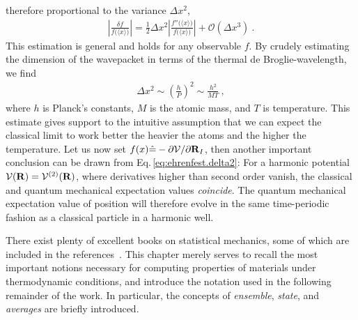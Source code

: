 therefore proportional to the variance $\Delta x^2$,
\begin{align}
\left\lvert \frac{\delta f}{f \bm ( \langle x \rangle \bm{)}} \right\rvert
= \frac{1}{2} \Delta x^2 \left\lvert \frac{f'' \bm ( \langle x \rangle \bm{)}}{f \bm ( \langle x \rangle \bm{)}} \right\rvert
+ \mathcal{O}(\Delta x^3)~.
\label{eq:ehrenfest.delta2}
\end{align}
This estimation is general and holds for any observable $f$.
By crudely estimating the dimension of the wavepacket in terms of the thermal de Broglie-wavelength, we find
\begin{align}
\Delta x^2 
\sim \left( \frac{h}{P} \right)^2
\sim \frac{h^2}{MT}~,
\label{eq:ehrenfest:dimension}
\end{align}
where $h$ is Planck's constants, $M$ is the atomic mass, and $T$ is temperature. This estimate gives support to the intuitive assumption that we can expect the classical limit to work better the heavier the atoms and the higher the temperature.
Let us now set $f(x) \hat = -\partial \mathcal V / \partial {\bf R}_I$, then another important conclusion can be drawn from Eq.\,\eqref{eq:ehrenfest.delta2}: For a harmonic potential $\mathcal V ({\bf R}) = \mathcal V^{(2)} ({\bf R})$, where derivatives higher than second order vanish, the classical and quantum mechanical expectation values \emph{coincide}. The quantum mechanical expectation value of position will therefore evolve in the same time-periodic fashion as a classical particle in a harmonic well.



There exist plenty of excellent books on statistical mechanics, some of which are included in the references~\cite{Phillies2012,Tuckerman,Schrodinger1989}. This chapter merely serves to recall the most important notions necessary for computing properties of materials under thermodynamic conditions, and introduce the notation used in the following remainder of the work. In particular, the concepts of \emph{ensemble}, \emph{state}, and \emph{averages} are briefly introduced.

